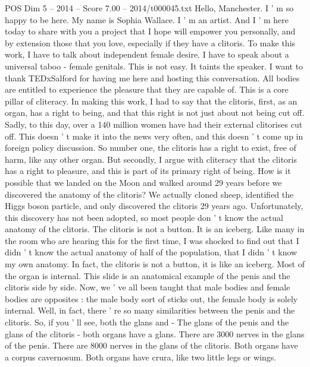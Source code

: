 \begin{textsample}{POS Dim 5 – 2014 – Score 7.00 – 2014/t000045.txt}  \label{ex:f5_pos_044}
Hello, Manchester.
I ' m so happy to be here.
My name is Sophia Wallace.
I ' m an artist.
And I ' m here today to share with you a project that I hope will empower you personally, and by extension those that you love, especially if they have a clitoris.
To make this work, I have to talk about independent female desire.
I have to speak about a universal taboo - female genitals.
This is not easy.
It taints the speaker.
I want to thank TEDxSalford for having me here and hosting this conversation.
All bodies are entitled to experience the pleasure that they are capable of.
This is a core pillar of cliteracy.
In making this work, I had to say that the clitoris, first, as an organ, has a right to being, and that this right is not just about not being cut off.
Sadly, to this day, over a 140 million women have had their external clitorises cut off.
This doesn ' t make it into the news very often, and this doesn ' t come up in foreign policy discussion.
So number one, the clitoris has a right to exist, free of harm, like any other organ.
But secondly, I argue with cliteracy that the clitoris has a right to pleasure, and this is part of its primary right of being.
How is it possible that we landed on the Moon and walked around 29 years before we discovered the anatomy of the clitoris?
We actually cloned sheep, identified the Higgs boson particle, and only discovered the clitoris 29 years ago.
Unfortunately, this discovery has not been adopted, so most people don ' t know the actual anatomy of the clitoris.
The clitoris is not a button.
It is an iceberg.
Like many in the room who are hearing this for the first time, I was shocked to find out that I didn ' t know the actual anatomy of half of the population, that I didn ' t know my own anatomy.
In fact, the clitoris is not a button, it is like an iceberg.
Most of the organ is internal.
This slide is an anatomical example of the penis and the clitoris side by side.
Now, we ' ve all been taught that male bodies and female bodies are opposites : the male body sort of sticks out, the female body is solely internal.
Well, in fact, there ' re so many similarities between the penis and the clitoris.
So, if you ' ll see, both the glans and - The glans of the penis and the glans of the clitoris - both organs have a glans.
There are 3000 nerves in the glans of the penis.
There are 8000 nerves in the glans of the clitoris.
Both organs have a corpus cavernosum.
Both organs have crura, like two little legs or wings.

\end{textsample}
